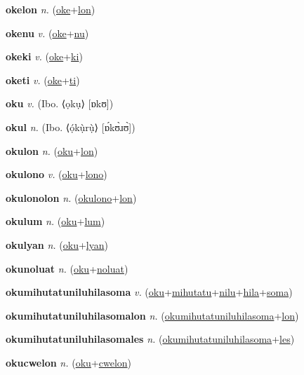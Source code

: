 \textbf{\hypertarget{okelon}{okelon}} \textit{n.} (\hyperlink{oke}{oke}+\allowbreak \hyperlink{lon}{lon})


\textbf{\hypertarget{okenu}{okenu}} \textit{v.} (\hyperlink{oke}{oke}+\allowbreak \hyperlink{nu}{nu})


\textbf{\hypertarget{okeki}{okeki}} \textit{v.} (\hyperlink{oke}{oke}+\allowbreak \hyperlink{ki}{ki})


\textbf{\hypertarget{oketi}{oketi}} \textit{v.} (\hyperlink{oke}{oke}+\allowbreak \hyperlink{ti}{ti})


\textbf{\hypertarget{oku}{oku}} \textit{v.} (Ibo. ⟨ọkụ⟩ [ɒkʊ])


\textbf{\hypertarget{okul}{okul}} \textit{n.} (Ibo. ⟨ọ́kụ̀rụ̀⟩ [ɒ́kʊ̀ɹʊ̀])


\textbf{\hypertarget{okulon}{okulon}} \textit{n.} (\hyperlink{oku}{oku}+\allowbreak \hyperlink{lon}{lon})


\textbf{\hypertarget{okulono}{okulono}} \textit{v.} (\hyperlink{oku}{oku}+\allowbreak \hyperlink{lono}{lono})


\textbf{\hypertarget{okulonolon}{okulonolon}} \textit{n.} (\hyperlink{okulono}{okulono}+\allowbreak \hyperlink{lon}{lon})


\textbf{\hypertarget{okulum}{okulum}} \textit{n.} (\hyperlink{oku}{oku}+\allowbreak \hyperlink{lum}{lum})


\textbf{\hypertarget{okulyan}{okulyan}} \textit{n.} (\hyperlink{oku}{oku}+\allowbreak \hyperlink{lyan}{lyan})


\textbf{\hypertarget{okunoluat}{okunoluat}} \textit{n.} (\hyperlink{oku}{oku}+\allowbreak \hyperlink{noluat}{noluat})


\textbf{\hypertarget{okumihutatuniluhilasoma}{okumihutatuniluhilasoma}} \textit{v.} (\hyperlink{oku}{oku}+\allowbreak \hyperlink{mihutatu}{mihutatu}+\allowbreak \hyperlink{nilu}{nilu}+\allowbreak \hyperlink{hila}{hila}+\allowbreak \hyperlink{soma}{soma})


\textbf{\hypertarget{okumihutatuniluhilasomalon}{okumihutatuniluhilasomalon}} \textit{n.} (\hyperlink{okumihutatuniluhilasoma}{okumihutatuniluhilasoma}+\allowbreak \hyperlink{lon}{lon})


\textbf{\hypertarget{okumihutatuniluhilasomales}{okumihutatuniluhilasomales}} \textit{n.} (\hyperlink{okumihutatuniluhilasoma}{okumihutatuniluhilasoma}+\allowbreak \hyperlink{les}{les})


\textbf{\hypertarget{okucwelon}{okucwelon}} \textit{n.} (\hyperlink{oku}{oku}+\allowbreak \hyperlink{cwelon}{cwelon})


